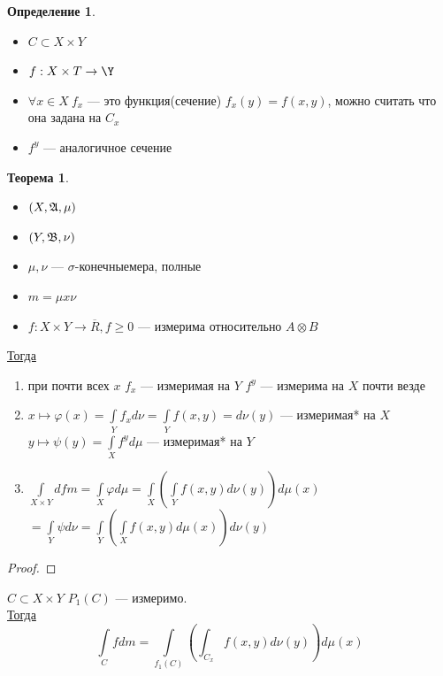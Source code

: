 \documentclass[oneside]{book}
\newcommand{\todo}{{\color{red}\fbox{\text{Доделать}}}}
\theoremstyle{plain}
\theoremstyle{remark}
\theoremstyle{definition}
\newtheorem{theorem}{Теорема}[section]
\newtheorem*{definition}{Определение}
\begin{document}
\begin{definition}
\-
\begin{itemize}
\item \(C \subset X \times Y\)
\item \(f: X \times T \to \Y\)
\item \(\forall x \in X\ f_x\) --- это функция(сечение) \(f_x(y) = f(x, y)\), можно считать что она задана на \(C_x\)
\item \(f^y\) --- аналогичное сечение
\end{itemize}
\end{definition}
\begin{theorem}
\-
\begin{itemize}
\item \((X, \mathfrak{A}, \mu)\)
\item \((Y, \mathfrak{B}, \nu)\)
\item \(\mu, \nu\) --- \(\sigma\)-конечныемера, полные
\item \(m = \mu x \nu\)
\item \(f: X \times Y \to \overline{R}, f \ge 0\) --- измерима относительно \(A\otimes B\)
\end{itemize}
\uline{Тогда}
\begin{enumerate}
\item при  почти всех \(x\) \(f_x\) --- измеримая на \(Y\) \color{blue}\(f^y\) --- измерима на \(X\) почти везде\color{black}
\item \(x \mapsto \varphi(x)=\int\limits_Y f_x d\nu = \int\limits_Y f(x, y) = d\nu(y)\) --- измеримая* на \(X\) \\
\color{blue}\(y \mapsto \psi(y) = \int\limits_X f^y d\mu\) --- измеримая* на \(Y\)\color{black}
\item \(\int\limits_{X \times Y} d fm = \int\limits_X \varphi d\mu = \int\limits_X\left(\int\limits_Y f(x, y) d\nu(y)\right)d\mu(x)\) \\
\color{blue}\(= \int\limits_Y \psi d\nu = \int\limits_Y\left(\int\limits_X f(x, y) d\mu(x)\right)d\nu(y)\)
\end{enumerate}
\end{theorem}
\begin{proof}
\todo
\end{proof}
\begin{corllary}
\(C \subset X \times Y\) \(P_1(C)\) --- измеримо. \\
\uline{Тогда} \[ \int\limits_C f dm = \int\limits_{f_1(C)}\left(\int_{C_x} f(x, y) d\nu(y)\right)d\mu(x) \]
\end{corllary}
\end{document}
